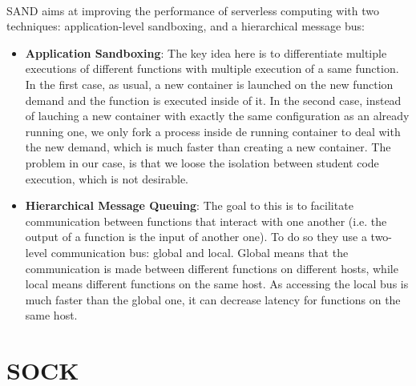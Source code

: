 \paragraph{}SAND\cite{akkus2018sand} aims at improving the performance of serverless computing with two techniques: application-level sandboxing, and a hierarchical message bus:
\begin{itemize}
\renewcommand\labelitemi{--}
  \item \textbf{Application Sandboxing}: The key idea here is to differentiate multiple executions of different functions with multiple execution of a same function.  In the first case, as usual, a new container is launched on the new function demand and the function is executed inside of it.  In the second case, instead of lauching a new container with exactly the same configuration as an already running one, we only fork a process inside de running container to deal with the new demand, which is much faster than creating a new container.  The problem in our case, is that we loose the isolation between student code execution, which is not desirable.
  \item \textbf{Hierarchical Message Queuing}: The goal to this is to facilitate communication between functions that interact with one another (i.e. the output of a function is the input of another one).  To do so they use a two-level communication bus: global and local.  Global means that the communication is made between different functions on different hosts, while local means different functions on the same host.  As accessing the local bus is much faster than the global one, it can decrease latency for functions on the same host.  %
\end{itemize}

\section{SOCK} \label{subsec-sock}
